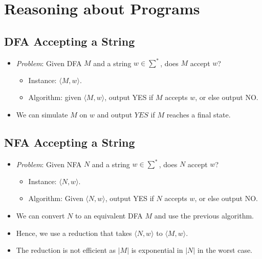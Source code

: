 \documentclass[12pt]{article}
\begin{document}
\section{Reasoning about Programs}

\subsection{DFA Accepting a String}
\begin{itemize}
    \item \textit{Problem}: Given DFA $M$ and a string $w \in \sum^\ast$, does $M$ accept $w$?
    \begin{itemize}
        \item Instance: $\langle M, w \rangle$.
        \item Algorithm: given $\langle M, w \rangle$, output YES if $M$ accepts $w$, or else output NO.
    \end{itemize}
    \item We can simulate $M$ on $w$ and output $YES$ if $M$ reaches a final state.
\end{itemize}

\subsection{NFA Accepting a String}
\begin{itemize}
    \item \textit{Problem}: Given NFA $N$ and a string $w \in \sum^\ast$, does $N$ accept $w$?
    \begin{itemize}
        \item Instance: $\langle N, w \rangle$.
        \item Algorithm: Given $\langle N, w \rangle$, output YES if $N$ accepts $w$, or else output NO.
    \end{itemize}
    \item We can convert $N$ to an equivalent DFA $M$ and use the previous algorithm.
    \item Hence, we use a reduction that takes $\langle N, w \rangle$ to $\langle M, w \rangle$.
    \item The reduction is not efficient as $\left| M \right|$ is exponential in $\left| N \right|$ in the worst case.
\end{itemize}
\end{document}
